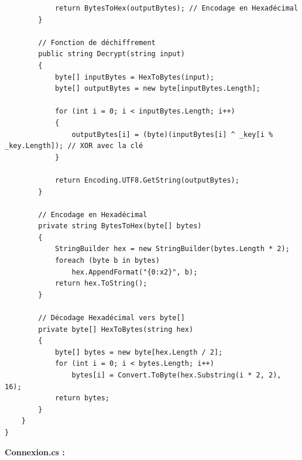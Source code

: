 \documentclass[main.tex]{subfiles}
\begin{document}
\begin{lstlisting}
            return BytesToHex(outputBytes); // Encodage en Hexadécimal
        }

        // Fonction de déchiffrement
        public string Decrypt(string input)
        {
            byte[] inputBytes = HexToBytes(input);
            byte[] outputBytes = new byte[inputBytes.Length];

            for (int i = 0; i < inputBytes.Length; i++)
            {
                outputBytes[i] = (byte)(inputBytes[i] ^ _key[i % _key.Length]); // XOR avec la clé
            }

            return Encoding.UTF8.GetString(outputBytes);
        }

        // Encodage en Hexadécimal
        private string BytesToHex(byte[] bytes)
        {
            StringBuilder hex = new StringBuilder(bytes.Length * 2);
            foreach (byte b in bytes)
                hex.AppendFormat("{0:x2}", b);
            return hex.ToString();
        }

        // Décodage Hexadécimal vers byte[]
        private byte[] HexToBytes(string hex)
        {
            byte[] bytes = new byte[hex.Length / 2];
            for (int i = 0; i < bytes.Length; i++)
                bytes[i] = Convert.ToByte(hex.Substring(i * 2, 2), 16);
            return bytes;
        }
    }
}
\end{lstlisting}


\textbf{Connexion.cs :}
\end{document}
